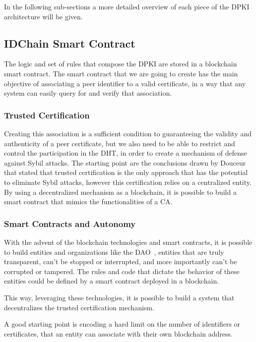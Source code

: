 In the following sub-sections a more detailed overview of each piece of the \ac{DPKI} architecture will be given.

\subsection{IDChain Smart Contract}

The logic and set of rules that compose the \ac{DPKI} are stored in a blockchain smart contract.
The smart contract that we are going to create has the main objective of associating a peer identifier to a valid certificate, in a way that any system can easily query for and verify that association.

\subsubsection{Trusted Certification}
Creating this association is a sufficient condition to guaranteeing the validity and authenticity of a peer certificate, but we also need to be able to restrict and control the participation in the \ac{DHT}, in order to create a mechanism of defense against Sybil attacks.
The starting point are the conclusions drawn by Douceur\cite{Douceur2002} that stated that trusted certification is the only approach that has the potential to eliminate Sybil attacks, however this certification relies on a centralized entity.
By using a decentralized mechanism as a blockchain, it is possible to build a smart contract that mimics the functionalities of a \ac{CA}.

\subsubsection{Smart Contracts and Autonomy}
With the advent of the blockchain technologies and smart contracts, it is possible to build entities and organizations like the \ac{DAO}~\cite{ralphc.merkle2016}, entities that are truly transparent, can't be stopped or interrupted, and more importantly can't be corrupted or tampered.
The rules and code that dictate the behavior of these entities could be defined by a smart contract deployed in a blockchain.

This way, leveraging these technologies, it is possible to build a system that decentralizes the trusted certification mechanism.

A good starting point is encoding a hard limit on the number of identifiers or certificates, that an entity can associate with their own blockchain address.

